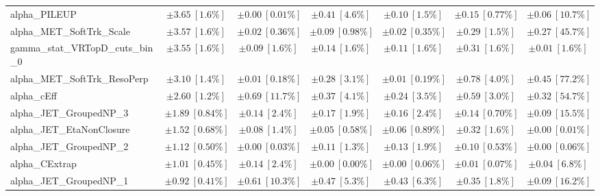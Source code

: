 \begin{sidewaystable}
\begin{center}
\begin{tabular*}{\textwidth}{@{\extracolsep{\fill}}lcccccc}
alpha\_PILEUP         & $\pm 3.65\ [1.6\%] $          & $\pm 0.00\ [0.01\%] $          & $\pm 0.41\ [4.6\%] $          & $\pm 0.10\ [1.5\%] $          & $\pm 0.15\ [0.77\%] $          & $\pm 0.06\ [10.7\%] $       \\
alpha\_MET\_SoftTrk\_Scale         & $\pm 3.57\ [1.6\%] $          & $\pm 0.02\ [0.36\%] $          & $\pm 0.09\ [0.98\%] $          & $\pm 0.02\ [0.35\%] $          & $\pm 0.29\ [1.5\%] $          & $\pm 0.27\ [45.7\%] $       \\
gamma\_stat\_VRTopD\_cuts\_bin\_0         & $\pm 3.55\ [1.6\%] $          & $\pm 0.09\ [1.6\%] $          & $\pm 0.14\ [1.6\%] $          & $\pm 0.11\ [1.6\%] $          & $\pm 0.31\ [1.6\%] $          & $\pm 0.01\ [1.6\%] $       \\
alpha\_MET\_SoftTrk\_ResoPerp         & $\pm 3.10\ [1.4\%] $          & $\pm 0.01\ [0.18\%] $          & $\pm 0.28\ [3.1\%] $          & $\pm 0.01\ [0.19\%] $          & $\pm 0.78\ [4.0\%] $          & $\pm 0.45\ [77.2\%] $       \\
alpha\_cEff         & $\pm 2.60\ [1.2\%] $          & $\pm 0.69\ [11.7\%] $          & $\pm 0.37\ [4.1\%] $          & $\pm 0.24\ [3.5\%] $          & $\pm 0.59\ [3.0\%] $          & $\pm 0.32\ [54.7\%] $       \\
alpha\_JET\_GroupedNP\_3         & $\pm 1.89\ [0.84\%] $          & $\pm 0.14\ [2.4\%] $          & $\pm 0.17\ [1.9\%] $          & $\pm 0.16\ [2.4\%] $          & $\pm 0.14\ [0.70\%] $          & $\pm 0.09\ [15.5\%] $       \\
alpha\_JET\_EtaNonClosure         & $\pm 1.52\ [0.68\%] $          & $\pm 0.08\ [1.4\%] $          & $\pm 0.05\ [0.58\%] $          & $\pm 0.06\ [0.89\%] $          & $\pm 0.32\ [1.6\%] $          & $\pm 0.00\ [0.01\%] $       \\
alpha\_JET\_GroupedNP\_2         & $\pm 1.12\ [0.50\%] $          & $\pm 0.00\ [0.03\%] $          & $\pm 0.11\ [1.3\%] $          & $\pm 0.13\ [1.9\%] $          & $\pm 0.10\ [0.53\%] $          & $\pm 0.00\ [0.06\%] $       \\
alpha\_CExtrap         & $\pm 1.01\ [0.45\%] $          & $\pm 0.14\ [2.4\%] $          & $\pm 0.00\ [0.00\%] $          & $\pm 0.00\ [0.06\%] $          & $\pm 0.01\ [0.07\%] $          & $\pm 0.04\ [6.8\%] $       \\
alpha\_JET\_GroupedNP\_1         & $\pm 0.92\ [0.41\%] $          & $\pm 0.61\ [10.3\%] $          & $\pm 0.47\ [5.3\%] $          & $\pm 0.43\ [6.3\%] $          & $\pm 0.35\ [1.8\%] $          & $\pm 0.09\ [16.2\%] $       \\

\end{tabular*}
\end{center}
\end{sidewaystable}
